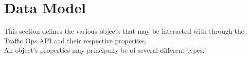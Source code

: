 %
%

\section{Data Model\label{sec:data-model}}
This section defines the various objects that may be interacted with through the
Traffic Ops API and their respective properties.\\
An object's properties may principally be of several different types:

